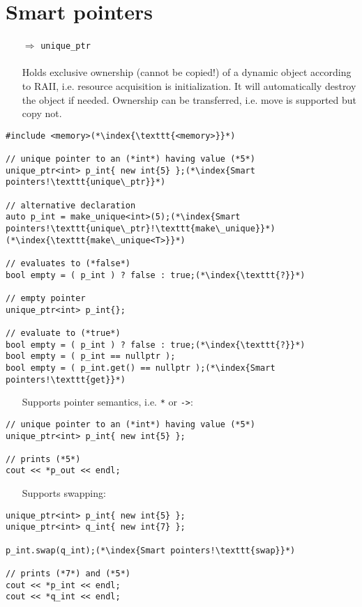 \documentclass[10pt]{article}
\begin{document}
\section{Smart pointers}
\small
\begin{enumerate}
\item[$\Rightarrow$] \texttt{unique\_ptr}\\ \\
Holds exclusive ownership (cannot be copied!) of a dynamic object according to RAII, i.e. resource acquisition is initialization. It will 
automatically destroy the object if needed. Ownership can be transferred, i.e. move is supported but copy not. 
\end{enumerate}
\begin{lstlisting}
#include <memory>(*\index{\texttt{<memory>}}*)

// unique pointer to an (*int*) having value (*5*)
unique_ptr<int> p_int{ new int{5} };(*\index{Smart pointers!\texttt{unique\_ptr}}*)

// alternative declaration
auto p_int = make_unique<int>(5);(*\index{Smart pointers!\texttt{unique\_ptr}!\texttt{make\_unique}}*)(*\index{\texttt{make\_unique<T>}}*)

// evaluates to (*false*)
bool empty = ( p_int ) ? false : true;(*\index{\texttt{?}}*)

// empty pointer
unique_ptr<int> p_int{};

// evaluate to (*true*)
bool empty = ( p_int ) ? false : true;(*\index{\texttt{?}}*)
bool empty = ( p_int == nullptr );
bool empty = ( p_int.get() == nullptr );(*\index{Smart pointers!\texttt{get}}*)
\end{lstlisting}
\begin{enumerate}
\item[] Supports pointer semantics, i.e. \texttt{*} or \texttt{->}:
\end{enumerate}
\begin{lstlisting}
// unique pointer to an (*int*) having value (*5*)
unique_ptr<int> p_int{ new int{5} };

// prints (*5*)
cout << *p_out << endl;
\end{lstlisting}
\begin{enumerate}
\item[] Supports swapping:
\end{enumerate}
\begin{lstlisting}
unique_ptr<int> p_int{ new int{5} };
unique_ptr<int> q_int{ new int{7} };
    
p_int.swap(q_int);(*\index{Smart pointers!\texttt{swap}}*)

// prints (*7*) and (*5*)
cout << *p_int << endl;
cout << *q_int << endl;
\end{lstlisting}
\end{document}
